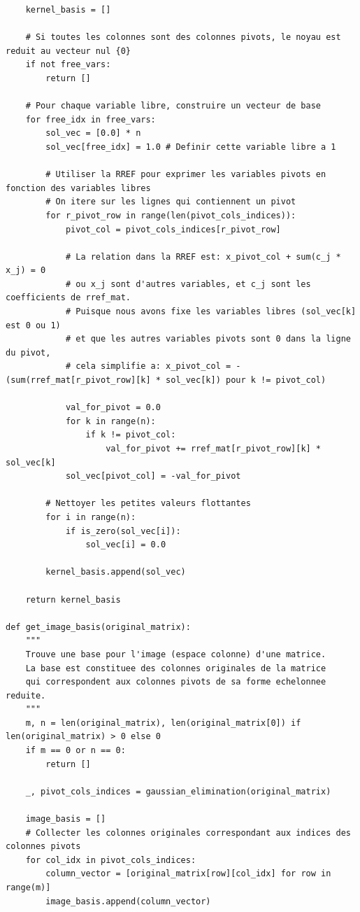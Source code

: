 \documentclass{report}
\begin{document}
\begin{verbatim}
    kernel_basis = []

    # Si toutes les colonnes sont des colonnes pivots, le noyau est reduit au vecteur nul {0}
    if not free_vars:
        return []

    # Pour chaque variable libre, construire un vecteur de base
    for free_idx in free_vars:
        sol_vec = [0.0] * n
        sol_vec[free_idx] = 1.0 # Definir cette variable libre a 1

        # Utiliser la RREF pour exprimer les variables pivots en fonction des variables libres
        # On itere sur les lignes qui contiennent un pivot
        for r_pivot_row in range(len(pivot_cols_indices)):
            pivot_col = pivot_cols_indices[r_pivot_row]

            # La relation dans la RREF est: x_pivot_col + sum(c_j * x_j) = 0
            # ou x_j sont d'autres variables, et c_j sont les coefficients de rref_mat.
            # Puisque nous avons fixe les variables libres (sol_vec[k] est 0 ou 1)
            # et que les autres variables pivots sont 0 dans la ligne du pivot,
            # cela simplifie a: x_pivot_col = - (sum(rref_mat[r_pivot_row][k] * sol_vec[k]) pour k != pivot_col)

            val_for_pivot = 0.0
            for k in range(n):
                if k != pivot_col:
                    val_for_pivot += rref_mat[r_pivot_row][k] * sol_vec[k]
            sol_vec[pivot_col] = -val_for_pivot

        # Nettoyer les petites valeurs flottantes
        for i in range(n):
            if is_zero(sol_vec[i]):
                sol_vec[i] = 0.0

        kernel_basis.append(sol_vec)

    return kernel_basis

def get_image_basis(original_matrix):
    """
    Trouve une base pour l'image (espace colonne) d'une matrice.
    La base est constituee des colonnes originales de la matrice
    qui correspondent aux colonnes pivots de sa forme echelonnee reduite.
    """
    m, n = len(original_matrix), len(original_matrix[0]) if len(original_matrix) > 0 else 0
    if m == 0 or n == 0:
        return []

    _, pivot_cols_indices = gaussian_elimination(original_matrix)

    image_basis = []
    # Collecter les colonnes originales correspondant aux indices des colonnes pivots
    for col_idx in pivot_cols_indices:
        column_vector = [original_matrix[row][col_idx] for row in range(m)]
        image_basis.append(column_vector)


\end{verbatim}
\end{document}
